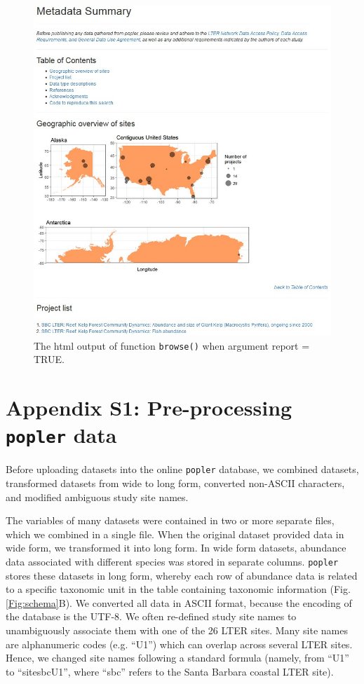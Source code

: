 \documentclass{article}\usepackage[]{graphicx}\usepackage[]{color}
\begin{document}
\newpage
\begin{figure}[h!]
  \begin{center}
    \includegraphics[scale=0.8]{reportT}
    \caption{The html output of function \texttt{browse()} when argument report = TRUE.}
    \label{Fig:reportT}
  \end{center}
\end{figure}

\newpage

\section*{Appendix S1: Pre-processing \texttt{popler} data}
Before uploading datasets into the online \texttt{popler} database, we combined datasets, transformed datasets from wide to long form, converted non-ASCII characters, and modified ambiguous study site names.


The variables of many datasets were contained in two or more separate files, which we combined in a single file. When the original dataset provided data in wide form, we transformed it into long form. In wide form datasets, abundance data associated with different species was stored in separate columns. \texttt{popler} stores these datasets in long form, whereby each row of abundance data is related to a specific taxonomic unit in the table containing taxonomic information (Fig. \ref{Fig:schema}B). We converted all data in ASCII format, because the encoding of the database is the UTF-8. We often re-defined study site names to unambiguously associate them with one of the 26 LTER sites. Many site names are alphanumeric codes (e.g. ``U1'') which can overlap across several LTER sites. Hence, we changed site names following a standard formula (namely, from ``U1'' to ``site\textunderscore sbc\textunderscore U1'', where ``sbc'' refers to the Santa Barbara coastal LTER site).
\end{document}
